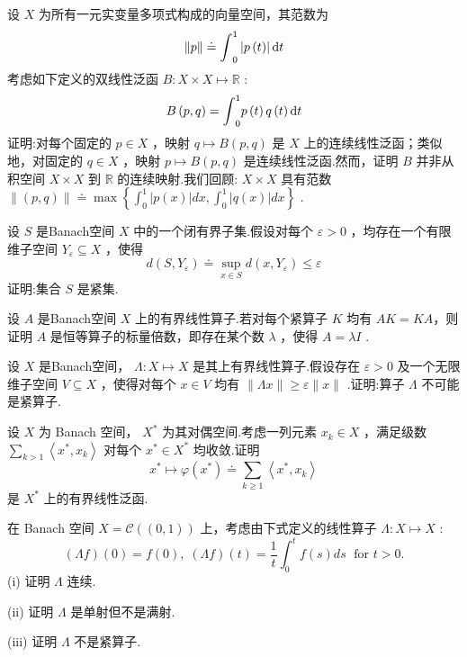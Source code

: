 \begin{rbhw}
设 $X$ 为所有一元实变量多项式构成的向量空间，其范数为
\[
\| p\|  \doteq  {\int }_{0}^{1}\left| {p\left( t\right) }\right| {\mathop{}\!\mathrm{d} t}
\]
考虑如下定义的双线性泛函 $B : X \times  X \mapsto  \mathbb{R}$ :
\[
B\left( {p,q}\right)  = {\int }_{0}^{1}p\left( t\right) q\left( t\right) {\mathop{}\!\mathrm{d} t}
\]
证明:对每个固定的 $p \in  X$ ，映射 $q \mapsto  B\left( {p,q}\right)$ 是 $X$ 上的连续线性泛函；类似地，对固定的 $q \in  X$ ，映射 $p \mapsto  B\left( {p,q}\right)$ 是连续线性泛函.然而，证明 $B$ 并非从积空间 $X \times  X$ 到 $\mathbb{R}$ 的连续映射.我们回顾: $X \times  X$ 具有范数 $\| \left( {p,q}\right) \|  \doteq  \max \left\{  {{\int }_{0}^{1}\left| {p\left( x\right) }\right| {dx},{\int }_{0}^{1}\left| {q\left( x\right) }\right| {dx}}\right\}$ .
\end{rbhw}

\begin{rbhw}
设 $S$ 是Banach空间 $X$ 中的一个闭有界子集.假设对每个 $\varepsilon  > 0$ ，均存在一个有限维子空间 ${Y}_{\varepsilon } \subseteq  X$ ，使得
\[
d\left( {S,{Y}_{\varepsilon }}\right)  \doteq  \mathop{\sup }\limits_{{x \in  S}}d\left( {x,{Y}_{\varepsilon }}\right)  \leq  \varepsilon
\]
证明:集合 $S$ 是紧集.
\end{rbhw}

\begin{rbhw}
设 $A$ 是Banach空间 $X$ 上的有界线性算子.若对每个紧算子 $K$ 均有 ${AK} = {KA}$，则证明 $A$ 是恒等算子的标量倍数，即存在某个数 $\lambda$ ，使得 $A = {\lambda I}$ .
\end{rbhw}


\begin{rbhw}
设 $X$ 是Banach空间， $\Lambda  : X \mapsto  X$ 是其上有界线性算子.假设存在 $\varepsilon  > 0$ 及一个无限维子空间 $V \subseteq  X$ ，使得对每个 $x \in  V$ 均有 $\| {\Lambda x}\|  \geq  \varepsilon \| x\|$ .证明:算子 $\Lambda$ 不可能是紧算子.
\end{rbhw}

\begin{rbhw}
设 $X$ 为 Banach 空间， ${X}^{ * }$ 为其对偶空间.考虑一列元素 ${x}_{k} \in  X$ ，满足级数 $\mathop{\sum }\limits_{{k > 1}}\left\langle  {{x}^{ * },{x}_{k}}\right\rangle$ 对每个 ${x}^{ * } \in  {X}^{ * }$ 均收敛.证明
\[
{x}^{ * } \mapsto  \varphi \left( {x}^{ * }\right)  \doteq  \mathop{\sum }\limits_{{k \geq  1}}\left\langle  {{x}^{ * },{x}_{k}}\right\rangle
\]
是 ${X}^{ * }$ 上的有界线性泛函.
\end{rbhw}

\begin{rbhw}
在 Banach 空间 $X = \mathcal{C}\left( \left(  {0,1}\right)  \right)$ 上，考虑由下式定义的线性算子 $\Lambda  : X \mapsto  X$ :
\[
\left( {\Lambda f}\right) \left( 0\right)  = f\left( 0\right) ,\;\left( {\Lambda f}\right) \left( t\right)  = \frac{1}{t}{\int }_{0}^{t}f\left( s\right) {ds}\;\text{ for }t > 0.
\]
(i) 证明 $\Lambda$ 连续.

(ii) 证明 $\Lambda$ 是单射但不是满射.

(iii) 证明 $\Lambda$ 不是紧算子.
\end{rbhw}

